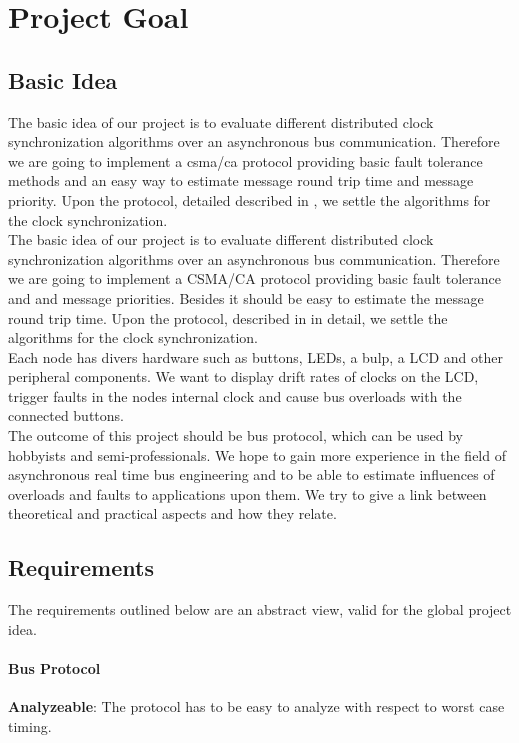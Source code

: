 \section{Project Goal}

\subsection{Basic Idea}
The basic idea of our project is to evaluate different distributed clock synchronization algorithms over an asynchronous bus communication. Therefore we are going to implement a csma/ca protocol providing basic fault tolerance methods and an easy way to estimate message round trip time and message priority.
Upon the protocol, detailed described in \cite[NESD2]{NESD2}, we settle the algorithms for the clock synchronization.\\

The basic idea of our project is to evaluate different distributed clock synchronization algorithms over an 
asynchronous bus communication. Therefore we are going to implement a CSMA/CA protocol providing basic fault 
tolerance and and message priorities. Besides it should be easy to estimate the message round trip time.
Upon the protocol, described in \cite[NESD2]{NESD2} in detail, we settle the algorithms for the clock synchronization.\\

Each node has divers hardware such as buttons, LEDs, a bulp, a LCD and other peripheral components. 
We want to display drift rates of clocks on the LCD, trigger faults in the nodes internal clock and  
cause bus overloads with the connected buttons.\\

The outcome of this project should be bus protocol, which can be used by hobbyists and semi-professionals. 
We hope to gain more experience in the field of asynchronous real time bus engineering and 
to be able to estimate influences of overloads and faults to applications upon them.
We try to give a link between theoretical and practical aspects and how they relate.


\subsection{Requirements}
The requirements outlined below are an abstract view, valid for the global project idea.

\paragraph{Bus Protocol}
\begin{req}
\label{req:ulftrtp:analyzeable}
\textbf{Analyzeable}: The protocol has to be easy to analyze with respect to worst case timing.
\end{req}

